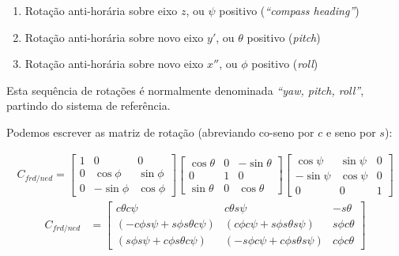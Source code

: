 \begin{enumerate}
    \item Rotação anti-horária sobre eixo \(z\), ou \(\psi\) positivo (\textit{``compass heading''})
    \item Rotação anti-horária sobre novo eixo \(y'\), ou \(\theta\) positivo (\textit{pitch})
    \item Rotação anti-horária sobre novo eixo \(x''\), ou \(\phi\) positivo (\textit{roll})
\end{enumerate}

Esta sequência de rotações é normalmente denominada \emph{``yaw, pitch, roll''}, partindo do sistema de referência.

Podemos escrever as matriz de rotação (abreviando co-seno por \(c\) e seno por \(s\)):

\begin{align*}
    C_{f\!r\!d\!/\!n\!e\!d} =
    \begin{bmatrix}
        1               &  0            &  0             \\
        0               &  \cos{\phi}   &  \sin{\phi}    \\
        0               & -\sin{\phi}   &  \cos{\phi}
    \end{bmatrix}
    \begin{bmatrix}
        \cos{ \theta}   &  0            & -\sin{\theta} \\
        0               &  1            &  0            \\
        \sin{ \theta}   &  0            &  \cos{\theta}
    \end{bmatrix}
    \begin{bmatrix}
        \cos{\psi}      &  \sin{\psi}   &  0             \\
       -\sin{\psi}      &  \cos{\psi}   &  0             \\
        0               &  0            &  1
    \end{bmatrix}
\end{align*}
\begin{align} \tag{1.3-10}
    C_{f\!r\!d\!/\!n\!e\!d} &=
    \begin{bmatrix}
        c\theta c\psi   & c\theta s\psi & -s\theta    \\
        \left(-c\phi s\psi + s\phi s\theta c\psi \right) 
        &  \left( c\phi c\psi + s\phi s\theta s\psi \right) 
        &  s\phi c\theta                                 \\
        \left( s\phi s\psi + c\phi s\theta c\psi \right) 
        &  \left( -s\phi c\psi + c\phi s\theta s\psi \right) 
        & c\phi c\theta
    \end{bmatrix}
\end{align}

